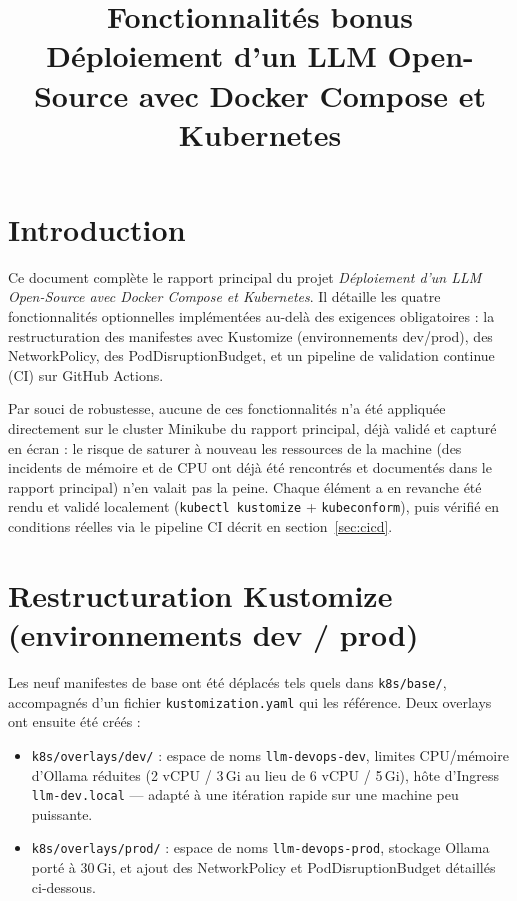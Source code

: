 ﻿\documentclass[11pt,a4paper]{article}
\title{\vspace{-1.5cm}\textbf{Fonctionnalités bonus} \\[0.2cm]
\large Déploiement d'un LLM Open-Source avec Docker Compose et Kubernetes}
\author{}
\date{}
\begin{document}
\maketitle
\thispagestyle{fancy}
\vspace{-1.2cm}

\section*{Introduction}

Ce document complète le rapport principal du projet \emph{Déploiement d'un LLM Open-Source avec Docker Compose et Kubernetes}. Il détaille les quatre fonctionnalités optionnelles implémentées au-delà des exigences obligatoires : la restructuration des manifestes avec Kustomize (environnements dev/prod), des NetworkPolicy, des PodDisruptionBudget, et un pipeline de validation continue (CI) sur GitHub Actions.

Par souci de robustesse, aucune de ces fonctionnalités n'a été appliquée directement sur le cluster Minikube du rapport principal, déjà validé et capturé en écran : le risque de saturer à nouveau les ressources de la machine (des incidents de mémoire et de CPU ont déjà été rencontrés et documentés dans le rapport principal) n'en valait pas la peine. Chaque élément a en revanche été rendu et validé localement (\texttt{kubectl kustomize} + \texttt{kubeconform}), puis vérifié en conditions réelles via le pipeline CI décrit en section~\ref{sec:cicd}.

\section{Restructuration Kustomize (environnements dev / prod)}

Les neuf manifestes de base ont été déplacés tels quels dans \texttt{k8s/base/}, accompagnés d'un fichier \texttt{kustomization.yaml} qui les référence. Deux overlays ont ensuite été créés :

\begin{itemize}[nosep]
    \item \texttt{k8s/overlays/dev/} : espace de noms \texttt{llm-devops-dev}, limites CPU/mémoire d'Ollama réduites (2 vCPU / 3\,Gi au lieu de 6 vCPU / 5\,Gi), hôte d'Ingress \texttt{llm-dev.local} --- adapté à une itération rapide sur une machine peu puissante.
    \item \texttt{k8s/overlays/prod/} : espace de noms \texttt{llm-devops-prod}, stockage Ollama porté à 30\,Gi, et ajout des NetworkPolicy et PodDisruptionBudget détaillés ci-dessous.
\end{itemize}
\end{document}
